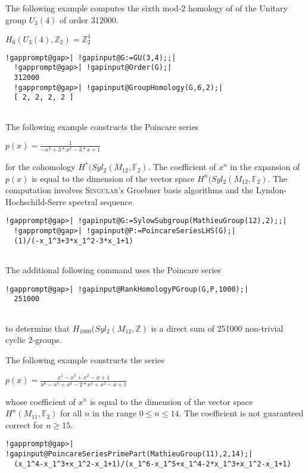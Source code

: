 \documentclass[a4paper,11pt]{report}
\begin{document}
{{\begin{Verbatim}[commandchars=!@|,fontsize=\small,frame=single,label=Example]
\end{Verbatim}
 

The following example computes the sixth mod-$2$ homology of of the Unitary group $U_3(4)$ of order 312000. 

$H_6(U_3(4),\mathbb Z_2) = \mathbb Z_2^{4}$ 
\begin{Verbatim}[commandchars=!@|,fontsize=\small,frame=single,label=Example]
  !gapprompt@gap>| !gapinput@G:=GU(3,4);;|
  !gapprompt@gap>| !gapinput@Order(G);|
  312000
  !gapprompt@gap>| !gapinput@GroupHomology(G,6,2);|
  [ 2, 2, 2, 2 ]
  
\end{Verbatim}
 

The following example constructs the Poincare series 

$p(x)=\frac{1}{-x^3+3*x^2-3*x+1}$ 

for the cohomology $H^\ast(Syl_2(M_{12},\mathbb F_2)$. The coefficient of $x^n$ in the expansion of $p(x)$ is equal to the dimension of the vector space $H^n(Syl_2(M_{12},\mathbb F_2)$. The computation involves \textsc{Singular}'s Groebner basis algorithms and the Lyndon-Hochschild-Serre spectral
sequence. 
\begin{Verbatim}[commandchars=!@|,fontsize=\small,frame=single,label=Example]
  !gapprompt@gap>| !gapinput@G:=SylowSubgroup(MathieuGroup(12),2);;|
  !gapprompt@gap>| !gapinput@P:=PoincareSeriesLHS(G);|
  (1)/(-x_1^3+3*x_1^2-3*x_1+1)
  
\end{Verbatim}
 The additional following command uses the Poincare series 
\begin{Verbatim}[commandchars=!@|,fontsize=\small,frame=single,label=Example]
  !gapprompt@gap>| !gapinput@RankHomologyPGroup(G,P,1000);|
  251000
  
\end{Verbatim}
 to determine that $H_{1000}(Syl_2(M_{12},\mathbb Z)$ is a direct sum of 251000 non-trivial cyclic $2$-groups. 

The following example constructs the series 

$p(x)=\frac{x^4-x^3+x^2-x+1}{x^6-x^5+x^4-2*x^3+x^2-x+1}$ 

whose coefficient of $x^n$ is equal to the dimension of the vector space $H^n(M_{11},\mathbb F_2)$ for all $n$ in the range $0\le n\le 14$. The coefficient is not guaranteed correct for $n\ge 15$. 
\begin{Verbatim}[commandchars=!@|,fontsize=\small,frame=single,label=Example]
  !gapprompt@gap>| !gapinput@PoincareSeriesPrimePart(MathieuGroup(11),2,14);|
  (x_1^4-x_1^3+x_1^2-x_1+1)/(x_1^6-x_1^5+x_1^4-2*x_1^3+x_1^2-x_1+1)
  

\end{Verbatim}}}
\end{document}
